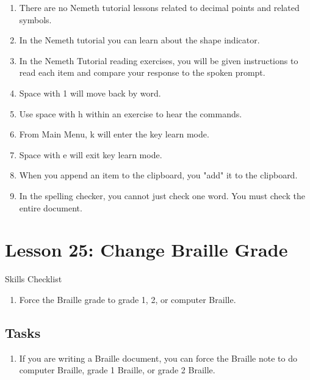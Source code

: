\documentclass[10pt,letterpaper,twoside]{report}
\begin{document}
{{{{\begin{enumerate}
	\item There are no Nemeth tutorial lessons related to decimal points and related symbols.
	      
	\item In the Nemeth tutorial you can learn about the shape indicator.
	      
	\item In the Nemeth Tutorial reading exercises, you will be given instructions to read each item and compare your response to the spoken prompt.
	      
	\item Space with 1 will move back by word.
	      
	\item Use space with h within an exercise to hear the commands.
	      
	\item From Main Menu, k will enter the key learn mode.
	      
	\item Space with e will exit key learn mode.
	      
	\item When you append an item to the clipboard, you "add" it to the clipboard.
	      
	\item In the spelling checker, you cannot just check one word.  You must check the entire document.
\end{enumerate}



\section*{Lesson 25: Change Braille Grade}


Skills Checklist



\begin{enumerate}
	\item Force the Braille grade to grade 1, 2, or computer Braille.
\end{enumerate}



 \subsection{Tasks}



\begin{enumerate}
	\item If you are writing a Braille document, you can force the Braille note to do computer Braille, grade 1 Braille, or grade 2 Braille.
	      

\end{enumerate}}}}}
\end{document}

